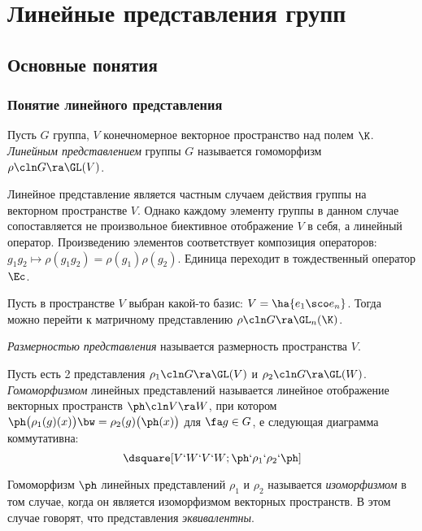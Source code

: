 \documentclass[a4paper]{article}
\begin{document}
\section{Линейные представления групп}

\subsection{Основные понятия}

\subsubsection{Понятие линейного представления}

\begin{df}
Пусть $G$ группа, $V$ конечномерное векторное пространство над полем $\K$. \emph{Линейным
представлением} группы $G$ называется гомоморфизм $\rho\cln G \ra \GL(V)$.
\end{df}

Линейное представление является частным случаем действия группы на векторном пространстве $V$. Однако
каждому элементу группы в данном случае сопоставляется не произвольное биективное отображение $V$ в себя, а
линейный оператор. Произведению элементов соответствует композиция операторов: $g_1 g_2 \mapsto \rho(g_1
g_2)=\rho(g_1)\rho(g_2)$. Единица переходит в тождественный оператор $\Ec$.

Пусть в пространстве $V$ выбран какой-то базис: $V=\ha{e_1 \sco e_n}$. Тогда можно перейти к матричному
представлению $\rho\cln G \ra \GL_n(\K)$.

\begin{df}
\emph{Размерностью представления} называется размерность пространства $V$.
\end{df}

\begin{df}
Пусть есть 2 представления $\rho_1\cln G \ra \GL(V)$ и $\rho_2\cln G \ra \GL(W)$. \emph{Гомоморфизмом}  линейных
представлений называется линейное отображение векторных пространств $\ph\cln V \ra W$, при котором
$\ph\bigl(\rho_1(g)(x)\bigr)\bw=\rho_2(g)\bigl(\ph(x)\bigr)$ для $\fa g \in G$, е следующая диаграмма
коммутативна:
$$\dsquare[V`W`V`W;\ph`\rho_1`\rho_2`\ph]$$
\end{df}

\begin{df}
Гомоморфизм $\ph$ линейных представлений $\rho_1$ и $\rho_2$ называется \emph{изоморфизмом} в том случае,
когда он является изоморфизмом векторных пространств. В этом случае говорят, что представления
\emph{эквивалентны}.
\end{df}
\end{document}
